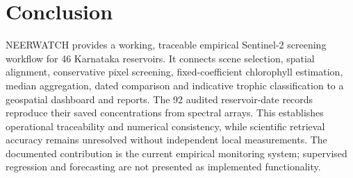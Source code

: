 \documentclass[conference]{IEEEtran}
\begin{document}
\section{Conclusion}
NEERWATCH provides a working, traceable empirical Sentinel-2 screening workflow for 46 Karnataka reservoirs. It connects scene selection, spatial alignment, conservative pixel screening, fixed-coefficient chlorophyll estimation, median aggregation, dated comparison and indicative trophic classification to a geospatial dashboard and reports. The 92 audited reservoir-date records reproduce their saved concentrations from spectral arrays. This establishes operational traceability and numerical consistency, while scientific retrieval accuracy remains unresolved without independent local measurements. The documented contribution is the current empirical monitoring system; supervised regression and forecasting are not presented as implemented functionality.
\end{document}
